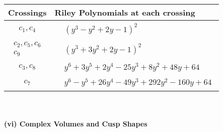\documentclass[1p]{elsarticle_modified}
\theoremstyle{definition}
\begin{document}
\begin{tabular}{m{50pt}|m{274pt}}
Crossings & \hspace{64pt}Riley Polynomials at each crossing \\
\hline $$\begin{aligned}c_{1},c_{4}\end{aligned}$$&$\begin{aligned}
&(y^3- y^2+2 y-1)^2
\end{aligned}$\\
\hline $$\begin{aligned}c_{2},c_{5},c_{6}\\c_{9}\end{aligned}$$&$\begin{aligned}
&(y^3+3 y^2+2 y-1)^2
\end{aligned}$\\
\hline $$\begin{aligned}c_{3},c_{8}\end{aligned}$$&$\begin{aligned}
&y^6+3 y^5+2 y^4-25 y^3+8 y^2+48 y+64
\end{aligned}$\\
\hline $$\begin{aligned}c_{7}\end{aligned}$$&$\begin{aligned}
&y^6- y^5+26 y^4-49 y^3+292 y^2-160 y+64
\end{aligned}$\\
\hline
\end{tabular}\\~\\
\newpage\flushleft \textbf{(vi) Complex Volumes and Cusp Shapes}
\end{document}
